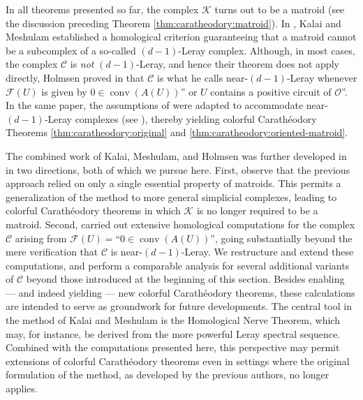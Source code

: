\documentclass[a4paper,11pt,reqno, english]{amsart}
\theoremstyle{definition}
\theoremstyle{remark}
\DeclareMathOperator{\conv}{\mathrm{conv}}
\begin{document}
\medskip
In all theorems presented so far, the complex $\mathscr{K}$ turns out to be a matroid (see the discussion preceding Theorem \ref{thm:caratheodory:matroid}). 
In \cite[Theorem 1.6]{KalaiMeshulam2005}, Kalai and Meshulam established a homological criterion guaranteeing that a matroid cannot be a subcomplex of a so-called $(d-1)$-Leray complex. 
Although, in most cases, the complex $\mathscr{C}$ is \emph{not} $(d-1)$-Leray, and hence their theorem does not apply directly, Holmsen proved in \cite[Prop.\,1.3]{Holmsen2016} that $\mathscr{C}$ is what he calls near-$(d-1)$-Leray whenever $\mathcal{F}(U)$ is given by $0\in\conv(A(U))$'' or $U$ contains a positive circuit of $\mathscr{O}$''. 
In the same paper, the assumptions of \cite[Thm.\,1.6]{KalaiMeshulam2005} were adapted to accommodate near-$(d-1)$-Leray complexes (see \cite[Thm.\,1.4]{Holmsen2016}), thereby yielding colorful Carath\'eodory Theorems \ref{thm:caratheodory:original} and \ref{thm:caratheodory:oriented-matroid}.

\medskip
The combined work of Kalai, Meshulam, and Holmsen was further developed in \cite{Blagojevic2025} in two directions, both of which we pursue here. 
First, observe that the previous approach relied on only a single essential property of matroids. 
This permits a generalization of the method to more general simplicial complexes, leading to colorful Carath\'eodory theorems in which $\mathscr{K}$ is no longer required to be a matroid. 
Second, \cite{Blagojevic2025} carried out extensive homological computations for the complex $\mathscr{C}$ arising from $\mathcal{F}(U)=$``$0\in\conv(A(U))$'', going substantially beyond the mere verification that $\mathscr{C}$ is near-$(d-1)$-Leray. 
We restructure and extend these computations, and perform a comparable analysis for several additional variants of $\mathscr{C}$ beyond those introduced at the beginning of this section. 
Besides enabling --- and indeed yielding --- new colorful Carath\'eodory theorems, these calculations are intended to serve as groundwork for future developments. The central tool in the method of Kalai and Meshulam is the Homological Nerve Theorem, which may, for instance, be derived from the more powerful Leray spectral sequence. 
Combined with the computations presented here, this perspective may permit extensions of colorful Carath\'eodory theorems even in settings where the original formulation of the method, as developed by the previous authors, no longer applies.
\end{document}
